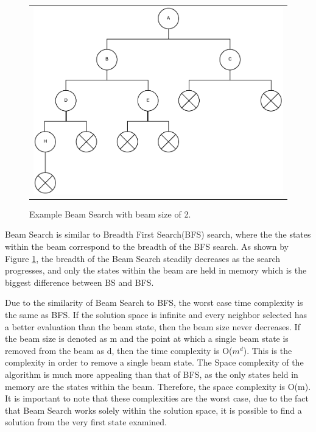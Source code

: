 \documentclass[10pt, twocolumn]{article}
\begin{document}

\begin{figure}[!h]
    \centering
    \begin{tabular}[b]{c}
        \includegraphics[width=.8\linewidth]{beamsearch.png} \\
    \end{tabular} \qquad
    \caption{Example Beam Search with beam size of 2.}  \label{beam_fig}
\end{figure}

Beam Search is similar to Breadth First Search(BFS) search, where the the states within the beam correspond to the breadth of the BFS search. As shown by Figure \ref{beam_fig}, the breadth of the Beam Search steadily decreases as the search progresses, and only the states within the beam are held in memory which is the biggest difference between BS and BFS.

Due to the similarity of Beam Search to BFS, the worst case time complexity is the same as BFS. If the solution space is infinite and every neighbor selected has a better evaluation than the beam state, then the beam size never decreases. If the beam size is denoted as m and the point at which a single beam state is removed from the beam as d, then the time complexity is O($m^d$). This is the complexity in order to remove a single beam state. The Space complexity of the algorithm is much more appealing than that of BFS, as the only states held in memory are the states within the beam. Therefore, the space complexity is O(m). It is important to note that these complexities are the worst case, due to the fact that Beam Search works solely within the solution space, it is possible to find a solution from the very first state examined.
\end{document}
